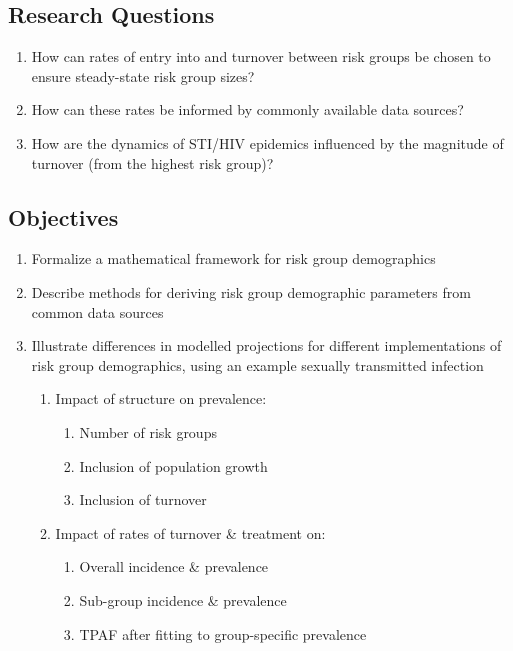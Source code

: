 \documentclass{article}
\date{2019 April 05}
\begin{document}
  \maketitle
  \subsection*{Research Questions}
  \begin{enumerate}
    \item How can rates of entry into and turnover between risk groups
    be chosen to ensure steady-state risk group sizes?
    \item How can these rates be informed by commonly available data sources?
    \item How are the dynamics of STI/HIV epidemics influenced by the magnitude of turnover
    (from the highest risk group)?
  \end{enumerate}
  \subsection*{Objectives}
  \begin{enumerate}
    \item Formalize a mathematical framework for risk group demographics
    \item Describe methods for deriving risk group demographic parameters from common data sources
    \item Illustrate differences in modelled projections
    for different implementations of risk group demographics,
    using an example sexually transmitted infection
    \begin{enumerate}
      \item Impact of structure on prevalence:
      \begin{enumerate}
        \item Number of risk groups
        \item Inclusion of population growth
        \item Inclusion of turnover
      \end{enumerate}
      \item Impact of rates of turnover \& treatment on:
      \begin{enumerate}
        \item Overall incidence \& prevalence
        \item Sub-group incidence \& prevalence
        \item TPAF after fitting to group-specific prevalence
      \end{enumerate}
    \end{enumerate}
  \end{enumerate}
\end{document}
